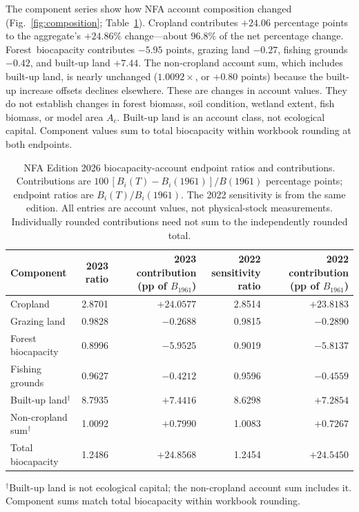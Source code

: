 \documentclass[preprint,12pt,authoryear]{elsarticle}
\begin{document}
The component series show how NFA account composition changed (Fig.~\ref{fig:composition}; Table~\ref{tab:nfa_components}). Cropland contributes $+24.06$ percentage points to the aggregate's $+24.86\%$ change—about $96.8\%$ of the net percentage change. \mbox{Forest biocapacity} contributes $-5.95$ points, grazing land $-0.27$, fishing grounds $-0.42$, and built-up land $+7.44$. The non-cropland account sum, which includes built-up land, is nearly unchanged ($1.0092\times$, or $+0.80$ points) because the built-up increase offsets declines elsewhere. These are changes in account values. They do not establish changes in forest biomass, soil condition, wetland extent, fish biomass, or model area $A_c$. Built-up land is an account class, not ecological capital. Component values sum to total biocapacity within workbook rounding at both endpoints.

\begin{table}[!htbp]
\centering\footnotesize
\caption{NFA Edition 2026 biocapacity-account endpoint ratios and contributions. Contributions are $100\,[B_i(T)-B_i(1961)]/B(1961)$ percentage points; endpoint ratios are $B_i(T)/B_i(1961)$. The 2022 sensitivity is from the same edition. All entries are account values, not physical-stock measurements. Individually rounded contributions need not sum to the independently rounded total.}
\label{tab:nfa_components}
\begin{tabularx}{\textwidth}{@{}Xrrrr@{}}
\toprule
Component & \shortstack{2023\\ratio} & \shortstack{2023 contribution\\(pp of $B_{1961}$)} & \shortstack{2022 sensitivity\\ratio} & \shortstack{2022 contribution\\(pp of $B_{1961}$)} \\
\midrule
Cropland & 2.8701 & $+24.0577$ & 2.8514 & $+23.8183$ \\
Grazing land & 0.9828 & $-0.2688$ & 0.9815 & $-0.2890$ \\
Forest biocapacity & 0.8996 & $-5.9525$ & 0.9019 & $-5.8137$ \\
Fishing grounds & 0.9627 & $-0.4212$ & 0.9596 & $-0.4559$ \\
Built-up land$^{\dagger}$ & 8.7935 & $+7.4416$ & 8.6298 & $+7.2854$ \\
Non-cropland sum$^{\dagger}$ & 1.0092 & $+0.7990$ & 1.0083 & $+0.7267$ \\
\midrule
Total biocapacity & 1.2486 & $+24.8568$ & 1.2454 & $+24.5450$ \\
\bottomrule
\end{tabularx}
\begin{flushleft}\footnotesize
$^{\dagger}$Built-up land is not ecological capital; the non-cropland account sum includes it. Component sums match total biocapacity within workbook rounding. \end{flushleft}
\end{table}
\end{document}
